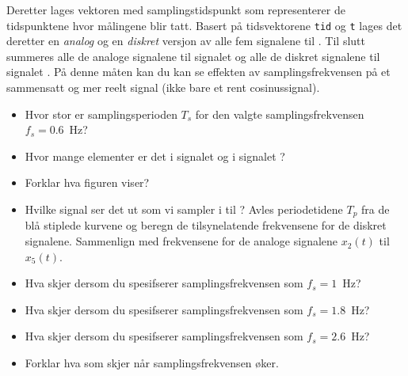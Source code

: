Deretter lages  vektoren  med samplingstidspunkt som
representerer de tidspunktene hvor målingene blir tatt. Basert på
tidsvektorene {\tt tid} og {\tt t} lages det deretter  
en {\it analog} og en {\it diskret} versjon av alle fem signalene
 til . Til slutt summeres alle de analoge signalene til
signalet  og alle de diskret signalene til signalet
. På denne måten kan du kan se effekten av
samplingsfrekvensen  på et sammensatt 
og mer reelt signal (ikke bare et rent cosinussignal).
\begin{itemize}
\item 
 Hvor stor er samplingsperioden $T_{s}$ for den valgte  
  samplingsfrekvensen $f_{s}{=}0.6$~Hz?
\item 
 Hvor mange elementer er det i signalet  og
 i signalet ?
\item 
 Forklar hva figuren viser? 
\item 
  Hvilke signal ser det ut som vi sampler i  til ?
  Avles periodetidene $T_{p}$ fra de blå stiplede kurvene og beregn
  de tilsynelatende frekvensene for de diskret signalene.
  Sammenlign med frekvensene for de 
  analoge signalene $x_{2}(t)$ til $x_{5}(t)$. 
\item 
 Hva skjer dersom du spesifserer samplingsfrekvensen som
 $f_{s}{=}1$~Hz? 

\item 
  Hva skjer dersom du spesifserer samplingsfrekvensen som
  $f_{s}{=}1.8$~Hz? 

\item 
   Hva skjer dersom du spesifserer samplingsfrekvensen som
   $f_{s}{=}2.6$~Hz? 

\item  Forklar hva som skjer når samplingsfrekvensen øker.



\end{itemize}
